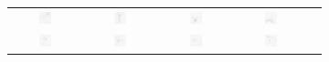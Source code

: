 \begin{figure}
\begin{subfigure}{0.45\textwidth}
\begin{tabular}{c@{\,}c@{\,}c@{\,}c@{\,}c@{}}
			\includegraphics[width=0.19\textwidth]{fig01b07} &
			\includegraphics[width=0.19\textwidth]{fig01b08} &
			\includegraphics[width=0.19\textwidth]{fig01b09} &
			\includegraphics[width=0.19\textwidth]{fig01b10} \\
			\includegraphics[width=0.19\textwidth]{fig01b11} &
			\includegraphics[width=0.19\textwidth]{fig01b12} &
			\includegraphics[width=0.19\textwidth]{fig01b13} &
			\includegraphics[width=0.19\textwidth]{fig01b14} &

\end{tabular}
\end{subfigure}
\end{figure}
